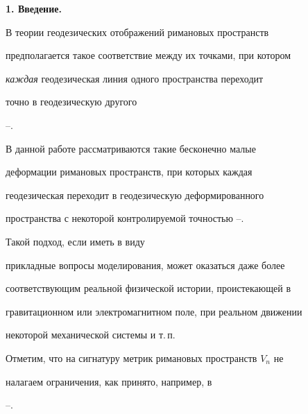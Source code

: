 \date{}




\pagestyle{plain} %







\maketitle


\label{begin}








{\bf 1. Введение.}


В теории геодезических отображений римановых пространств


предполагается такое соответствие между их точками, при котором 


{\it каждая} геодезическая линия одного пространства переходит


точно в геодезическую другого


\cite{le}--\cite{ramiga}.





В данной работе рассматриваются такие бесконечно малые


деформации римановых пространств, при которых каждая


геодезическая переходит в геодезическую деформированного


пространства с некоторой контролируемой точностью \cite{ramiga}--\cite{ga89}.


Такой подход, если иметь в виду


прикладные вопросы моделирования, может оказаться даже более


соответствующим реальной физической истории, проистекающей в


гравитационном или электромагнитном поле, при реальном движении


некоторой механической системы и т.\,п.





Отметим, что на сигнатуру метрик римановых пространств $V_n$ не


налагаем ограничения, как принято, например, в 


\cite{pe}--\cite{ramiga}. 


